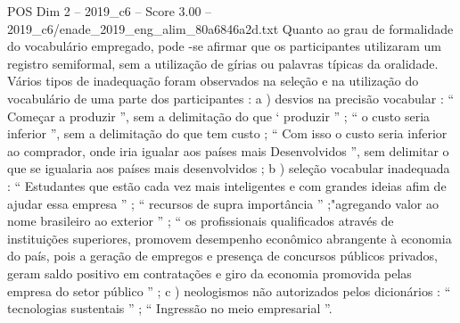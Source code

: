 \begin{textsample}{POS Dim 2 – 2019\_c6 – Score 3.00 – 2019\_c6/enade\_2019\_eng\_alim\_80a6846a2d.txt}
Quanto ao grau de formalidade do vocabulário empregado, pode -se afirmar que os participantes utilizaram um registro semiformal, sem a utilização de gírias ou palavras típicas da oralidade.
Vários tipos de inadequação foram observados na seleção e na utilização do vocabulário de uma parte dos participantes : a ) desvios na precisão vocabular : “ Começar a produzir ”, sem a delimitação do que ‘ produzir ” ; “ o custo seria inferior ”, sem a delimitação do que tem custo ; “ Com isso o custo seria inferior ao comprador, onde iria igualar aos países mais Desenvolvidos ”, sem delimitar o que se igualaria aos países mais desenvolvidos ; b ) seleção vocabular inadequada : “ Estudantes que estão cada vez mais inteligentes e com grandes ideias afim de ajudar essa empresa ” ; “ recursos de supra importância ” ;"agregando valor ao nome brasileiro ao exterior ” ; “ os profissionais qualificados através de instituições superiores, promovem desempenho econômico abrangente à economia do país, pois a geração de empregos e presença de concursos públicos privados, geram saldo positivo em contratações e giro da economia promovida pelas empresa do setor público ” ; c ) neologismos não autorizados pelos dicionários : “ tecnologias sustentais ” ; “ Ingressão no meio empresarial ”.

\end{textsample}
